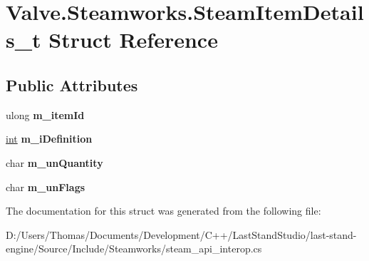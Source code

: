 \hypertarget{structValve_1_1Steamworks_1_1SteamItemDetails__t}{}\section{Valve.\+Steamworks.\+Steam\+Item\+Details\+\_\+t Struct Reference}
\label{structValve_1_1Steamworks_1_1SteamItemDetails__t}
\subsection*{Public Attributes}
\begin{DoxyCompactItemize}
\item 
\hypertarget{structValve_1_1Steamworks_1_1SteamItemDetails__t_a7b0c6f0da3edd1f349e671b3a19fbefc}{}ulong {\bfseries m\+\_\+item\+Id}\label{structValve_1_1Steamworks_1_1SteamItemDetails__t_a7b0c6f0da3edd1f349e671b3a19fbefc}

\item 
\hypertarget{structValve_1_1Steamworks_1_1SteamItemDetails__t_a08c8cd84c0344f6af5ebb35ad33df718}{}\hyperlink{SDL__thread_8h_a6a64f9be4433e4de6e2f2f548cf3c08e}{int} {\bfseries m\+\_\+i\+Definition}\label{structValve_1_1Steamworks_1_1SteamItemDetails__t_a08c8cd84c0344f6af5ebb35ad33df718}

\item 
\hypertarget{structValve_1_1Steamworks_1_1SteamItemDetails__t_a58fc95aecc152729939800c21c77b153}{}char {\bfseries m\+\_\+un\+Quantity}\label{structValve_1_1Steamworks_1_1SteamItemDetails__t_a58fc95aecc152729939800c21c77b153}

\item 
\hypertarget{structValve_1_1Steamworks_1_1SteamItemDetails__t_a8cb0fb90938826e815643cae4bb2971c}{}char {\bfseries m\+\_\+un\+Flags}\label{structValve_1_1Steamworks_1_1SteamItemDetails__t_a8cb0fb90938826e815643cae4bb2971c}

\end{DoxyCompactItemize}


The documentation for this struct was generated from the following file\+:\begin{DoxyCompactItemize}
\item 
D\+:/\+Users/\+Thomas/\+Documents/\+Development/\+C++/\+Last\+Stand\+Studio/last-\/stand-\/engine/\+Source/\+Include/\+Steamworks/steam\+\_\+api\+\_\+interop.\+cs\end{DoxyCompactItemize}
